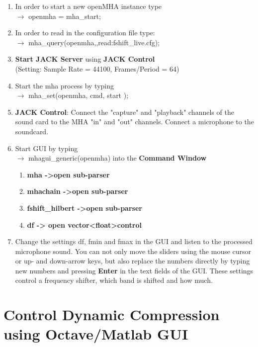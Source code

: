 \documentclass[11pt,a4paper,twoside]{article}
\newcommand{\+}{\discretionary{\mbox{\scriptsize$\hookleftarrow$}}{}{}}
\begin{document}
{{\begin{enumerate}
\item In order to start a new openMHA instance type \\
  $\rightarrow$ {\ttfamily openmha = mha\_start;}
\item In order to read in the configuration file type: \\
  $\rightarrow$ {\ttfamily mha\_query(openmha,\textquotesingle{}\textquotesingle{},\textquotesingle{}read:fshift\_live.cfg\textquotesingle{});}
\item \textbf{Start JACK Server} using \textbf{JACK Control}\\
  (Setting: Sample Rate = 44100, Frames/Period = 64)
\item Start the mha process by typing \\ $\rightarrow$
  {\ttfamily mha\_set(openmha, \textquotesingle{}cmd\textquotesingle{},
                      \textquotesingle{}start\textquotesingle{} );}
\item \textbf{JACK Control}: Connect the "capture" and "playback" channels
  of the sound card to the MHA "in" and "out" channels.
  Connect a microphone to the soundcard.
\item Start GUI by typing \\ $\rightarrow$
  {\ttfamily mhagui\_generic(openmha)} into the \textbf{Command Window}
\begin{enumerate}
\item \textbf{mha ->open sub-parser}
\item \textbf{mhachain ->open sub-parser}
\item \textbf{fshift\_hilbert ->open sub-parser}
\item \textbf{df -> open vector<float>control}
\end{enumerate}
\item Change the settings df, fmin and fmax in the GUI and listen to the
  processed microphone sound.
  You can not only move the sliders using the mouse cursor or up- and
  down-arrow keys, but also replace the numbers directly
  by typing new numbers and pressing \textbf{Enter}
  in the text fields of the GUI.
  These settings control a frequency shifter, which band is shifted and how
  much.
\end{enumerate}

\newpage

\section{Control Dynamic Compression using Octave/Matlab GUI}

}}
\end{document}
